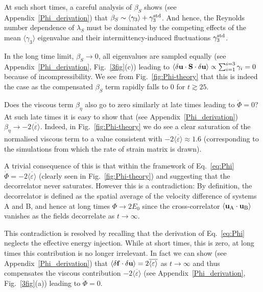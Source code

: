 \documentclass[amsmath,amssymb,amsbsy,pre,twocolumn,tightenlines,superscriptaddress,floatfix]{revtex4-2}
\begin{document}
At such short times, a careful analysis of $\beta_S$ shows (see Appendix~\ref{Phi_derivation}) that
$\beta_S \sim \langle \gamma_3 \rangle + \gamma_3^{\rm std}$. And hence, the Reynolds number
dependence of $\lambda_S$ must be dominated by the competing effects of the mean $\langle \gamma_3 \rangle$
eigenvalue and their intermittency-induced fluctuations $\gamma_3^{\rm std}$.

In the long time limit, $\beta_S \to 0$, all eigenvalues are sampled
equally (see Appendix~\ref{Phi_derivation}, Fig.~\ref{3fig}(c)) leading to  $\langle \delta {\bf u}\cdot \mathbf{S}
\cdot \delta {\bf u}\rangle \propto \sum_{i = 1}^{i=3} \gamma_i = 0$ because of
incompressibility. We see from Fig.~\ref{fig:Phi-theory} that this is indeed
the case as the compensated $\beta_S$ term rapidly falls to 0 for $t \gtrsim 25$.

Does the viscous term $\beta_\eta$ also go to zero similarly at late times
leading to $\dot{\Phi} = 0$?
At such late times it is easy to show that (see Appendix~\ref{Phi_derivation})
$\beta_\eta \to -2\overline{\langle \varepsilon\rangle}$. Indeed, in
Fig.~\ref{fig:Phi-theory} we do see a clear saturation of the normalised
viscous term to a value consistent with $-2\overline{\langle \varepsilon\rangle}
\approx 1.6$ (corresponding to the simulations from which the rate of strain
matrix is drawn).

A trivial consequence of this is that within the framework of
Eq.~\eqref{eq:Phi} $\dot{\Phi} = -2\overline{\langle \varepsilon\rangle}$ (clearly
seen in Fig.~\ref{fig:Phi-theory}) and suggesting that the decorrelator never
saturates. However this is a contradiction: By definition, the decorrelator is
defined as the spatial average of the velocity difference of systems A and B,
and hence at long times $\Phi \to 2E_0$ since the cross-correlator $\langle
{\bf u}_{\rm A} \cdot  {\bf u}_{\rm B}\rangle$ vanishes as the fields
decorrelate as $t \to \infty$.

This contradiction is resolved by recalling that the derivation of
Eq.~\eqref{eq:Phi} neglects the effective energy injection. While at short
times, this is zero, at long times this contribution is no longer irrelevant.
In fact we can show (see Appendix~\ref{Phi_derivation}) that $\langle \delta {\bf f}\cdot \delta
{\bf u} \rangle = 2\overline{\langle \varepsilon\rangle}$ as $t\to \infty$ and thus
compensates the viscous contribution $-2\overline{\langle \varepsilon\rangle}$ (see Appendix~\ref{Phi_derivation}, Fig.~\ref{3fig}(a))
leading to $\dot{\Phi} = 0$.
\end{document}
